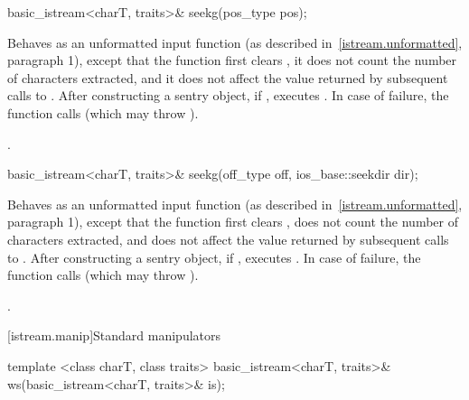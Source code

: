 %
%
\begin{itemdecl}
basic_istream<charT, traits>& seekg(pos_type pos);
\end{itemdecl}

\begin{itemdescr}
\pnum
\effects
Behaves as an unformatted input function (as described in~\ref{istream.unformatted}, paragraph 1), except that
the function first clears ,
it does not count
the number of characters extracted, and it does not affect the value
returned by subsequent calls to
.
After constructing a sentry object, if
,
executes
.
In case of failure, the function calls
(which may throw
).

\pnum
\returns
{}.
\end{itemdescr}

%
%
\begin{itemdecl}
basic_istream<charT, traits>& seekg(off_type off, ios_base::seekdir dir);
\end{itemdecl}

\begin{itemdescr}
\pnum
\effects
Behaves as an unformatted input function (as described in~\ref{istream.unformatted}, paragraph
1), except that the function first clears ,
does not count the number of characters extracted, and
does not affect the value returned by subsequent calls to .
After constructing a sentry object, if
,
executes
.
In case of failure, the function calls  (which may throw
).

\pnum
\returns
{}.
\end{itemdescr}

[istream.manip]{Standard  manipulators}

%
\begin{itemdecl}
template <class charT, class traits>
  basic_istream<charT, traits>& ws(basic_istream<charT, traits>& is);
\end{itemdecl}

